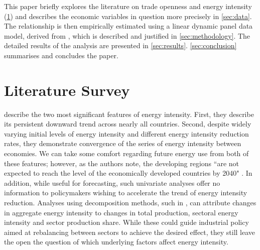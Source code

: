\documentclass[12pt,a4paper]{article}
\begin{document}
This paper briefly explores the literature on trade openness and energy intensity (\cref{sec:literature}) and describes the economic variables in question more precisely in \cref{sec:data}.
The relationship is then empirically estimated using a linear dynamic panel data model, derived from \cite{arellanoTestsSpecificationPanel1991}, which is described and justified in \cref{sec:methodology}.
The detailed results of the analysis are presented in \cref{sec:results}. \cref{sec:conclusion} summarises and concludes the paper.

\section{Literature Survey}\label{sec:literature}

\cite{ederAnalysisEnergyIntensity2018} describe the two most significant features of energy intensity. First, they describe its persistent downward trend across nearly all countries.
Second, despite widely varying initial levels of energy intensity and different energy intensity reduction rates, they demonstrate convergence of the series of energy intensity between economies.
We can take some comfort regarding future energy use from both of these features; however, as the authors note, the developing regions ``are not expected to reach the level of the economically developed countries by 2040" \citep[p. 1971]{ederAnalysisEnergyIntensity2018}.
In addition, while useful for forecasting, such univariate analyses offer no information to policymakers wishing to accelerate the trend of energy intensity reduction. 
Analyses using decomposition methods, such in \cite{liuEightMethodsDecomposing2003}, can attribute changes in aggregate energy intensity to changes in total production, sectoral energy intensity and sector production share. While these could guide industrial policy aimed at rebalancing between sectors to achieve the desired effect, they still leave the open the question of which underlying factors affect energy intensity.
\end{document}
